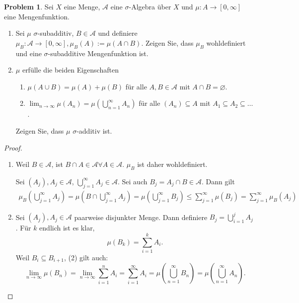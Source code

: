 \documentclass[prb,12pt]{revtex4-2}
\theoremstyle{definition}
\newtheorem{Problem}{Problem}
\theoremstyle{definition}
\newenvironment{parts}{\begin{enumerate}[label=(\alph*)]}{\end{enumerate}}
\begin{document}
\begin{Problem}
	Sei $X$ eine Menge, $\mathcal A$ eine $\sigma$-Algebra über $X$ und $\mu : A \to [0, \infty]$ eine Mengenfunktion.
	\begin{parts}
	\item  Sei $\mu$ $\sigma$-subadditiv, $B \in \mathcal A$ und definiere $\mu_B : \mathcal A \to [0,\infty ], \mu_B (A) := \mu(A \cap B)$. Zeigen Sie, dass $\mu_B$ wohldefiniert und eine $\sigma$-subadditive Mengenfunktion ist.
	\item $\mu$ erf\"{u}lle die beiden Eigenschaften
		\begin{enumerate}[label=(\arabic*)]
			\item $\mu(A\cup B)=\mu(A)+\mu(B)$ f\"{u}r alle $A,B\in \mathcal A$ mit $A\cap B=\varnothing$.
			\item $\lim_{n \to \infty} \mu\left( A_n \right) =\mu\left( \bigcup_{n=1} ^\infty A_n \right) $ f\"{u}r alle $(A_n)\subseteq A$ mit $A_1\subseteq A_2\subseteq \dots$.
		\end{enumerate}
		Zeigen Sie, dass $\mu$ $\sigma$-additiv ist.
	\end{parts}
\end{Problem}
\begin{proof}
	\begin{parts}
	\item Weil $B\in\mathcal A$, ist $B\cap A\in\mathcal A \forall A\in\mathcal A$. $\mu_B$ ist daher wohldefiniert. 

	Sei $(A_j), A_j\in\mathcal A$, $\bigcup_{j=1}^\infty A_j\in\mathcal A$. Sei auch $B_j=A_j\cap B\in \mathcal A$. Dann gilt
	\begin{gather*}
		\mu_B\left( \bigcup_{j=1} ^\infty A_j \right) =\mu\left( B\cap \bigcup_{j=1} ^\infty A_j \right)=\mu\left( \bigcup_{j=1} ^\infty B_j \right) \le \sum_{j=1}^\infty \mu(B_j)=\sum_{j=1}^\infty \mu_B(A_j) 
	\end{gather*}
	\item Sei $(A_j), A_j\in\mathcal A$ paarweise disjunkter Menge. Dann definiere $B_j=\bigcup_{i=1}^j A_j$. F\"{u}r $k$ endlich ist es klar,
		\[
			\mu(B_k)=\sum_{i=1}^k A_i
		.\]
		Weil $B_i\subseteq B_{i+1}$, (2) gilt auch:
		\[
			\lim_{n \to \infty} \mu(B_n)=\lim_{n \to \infty} \sum_{i=1}^n A_i=\sum_{i=1}^\infty A_i=\mu\left( \bigcup_{n=1} ^\infty B_n \right) =\mu\left( \bigcup_{n=1} ^\infty A_n \right) 
		.\] 
	\end{parts}
\end{proof}
\end{document}
